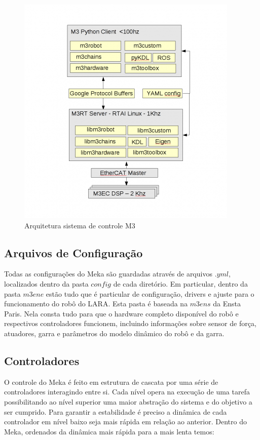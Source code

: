 
\begin{figure}[H]
    \centering
    \includegraphics[width=0.7\linewidth]{tex/figs/m3arch.png}
    \caption{Arquitetura sistema de controle M3 \cite{mekaguide}}
    \label{fig:m3arch}
\end{figure}

\subsection{Arquivos de Configuração}

Todas as configurações do Meka são guardadas através de arquivos $.yml$, localizados dentro da pasta $config$ de cada diretório. Em particular, dentro da pasta $m3ene$ estão tudo que é particular de configuração, drivers e ajuste para o funcionamento do robô do LARA. Esta pasta é baseada na $m3ens$ da Ensta Paris. Nela consta tudo para que o hardware completo disponível do robô e respectivos controladores funcionem, incluindo informações sobre sensor de força, atuadores, garra e parâmetros do modelo dinâmico do robô e da garra.

\subsection{Controladores}

O controle do Meka é feito em estrutura de cascata por uma série de controladores interagindo entre si. Cada nível opera na execução de uma tarefa possibilitando ao nível superior uma maior abstração do sistema e do objetivo a ser cumprido. Para garantir a estabilidade é preciso a dinâmica de cada controlador em nível baixo seja mais rápida em relação ao anterior. Dentro do Meka, ordenados da dinâmica mais rápida para a mais lenta temos:

